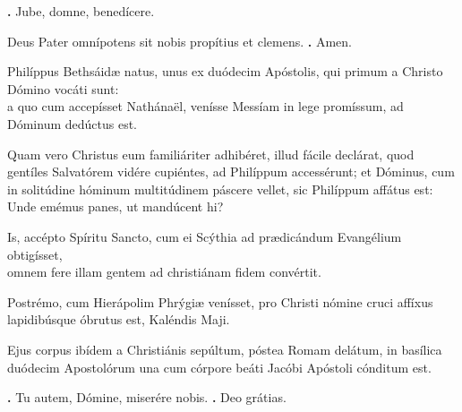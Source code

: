 \begin{small}
\textbf{\Vbar.} Jube, domne, benedícere.

Deus Pater omnípotens sit nobis propítius et clemens.
\textbf{\Rbar.} Amen.
\end{small}


Philíppus Bethsáidæ natus, unus ex duódecim Apóstolis, qui primum a Christo Dómino vocáti sunt: \\
a quo cum accepísset Nathánaël, venísse Messíam in lege promíssum, ad Dóminum dedúctus est. 

Quam vero Christus eum familiáriter adhibéret, illud fácile declárat, quod gentíles Salvatórem vidére cupiéntes, ad Philíppum accessérunt; 
et Dóminus, cum in solitúdine hóminum multitúdinem páscere vellet, sic Philíppum affátus est: \\
Unde emémus panes, ut mandúcent hi? 

Is, accépto Spíritu Sancto, cum ei Scýthia ad prædicándum Evangélium obtigísset,\\
omnem fere illam gentem ad christiánam fidem convértit. 

Postrémo, cum Hierápolim Phrýgiæ venísset, pro Christi nómine cruci affíxus lapidibúsque óbrutus est, Kaléndis Maji. 

Ejus corpus ibídem a Christiánis sepúltum, póstea Romam delátum, in basílica duódecim Apostolórum una cum córpore beáti Jacóbi Apóstoli cónditum est.

\textbf{\Vbar.} Tu autem, Dómine, miserére nobis.
\textbf{\Rbar.} Deo grátias.

